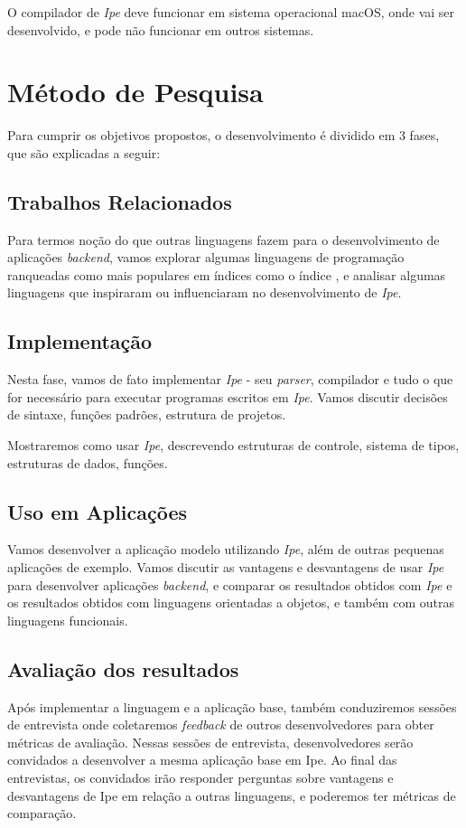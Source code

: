 O compilador de \textit{Ipe} deve funcionar em sistema operacional macOS, onde
vai ser desenvolvido, e pode não funcionar em outros sistemas.

\section{Método de Pesquisa}

Para cumprir os objetivos propostos, o desenvolvimento é dividido em 3 fases, que
são explicadas a seguir:

\subsection{Trabalhos Relacionados}

Para termos noção do que outras linguagens fazem para o desenvolvimento de
aplicações \textit{backend}, vamos explorar algumas linguagens de programação
ranqueadas como mais populares em índices como o índice \textcite{tiobeindex}, e analisar algumas
linguagens que inspiraram ou influenciaram no desenvolvimento de \textit{Ipe}.

\subsection{Implementação}

Nesta fase, vamos de fato implementar \textit{Ipe} - seu \textit{parser}, compilador
e tudo o que for necessário para executar programas escritos em \textit{Ipe}.
Vamos discutir decisões de sintaxe, funções padrões, estrutura de projetos.

Mostraremos como usar \textit{Ipe}, descrevendo estruturas de controle, sistema
de tipos, estruturas de dados, funções.

\subsection{Uso em Aplicações}

Vamos desenvolver a aplicação modelo utilizando \textit{Ipe}, além de outras
pequenas aplicações de exemplo. Vamos discutir as vantagens e desvantagens de
usar \textit{Ipe} para desenvolver aplicações \textit{backend}, e comparar os
resultados obtidos com \textit{Ipe} e os resultados obtidos com linguagens orientadas
a objetos, e também com outras linguagens funcionais.

\subsection{Avaliação dos resultados}

Após implementar a linguagem e a aplicação base, também conduziremos sessões
de entrevista onde coletaremos \textit{feedback} de outros desenvolvedores para
obter métricas de avaliação. Nessas sessões de entrevista, desenvolvedores serão
convidados a desenvolver a mesma aplicação base em Ipe. Ao final das entrevistas,
os convidados irão responder perguntas sobre vantagens e desvantagens de Ipe em
relação a outras linguagens, e poderemos ter métricas de comparação.
